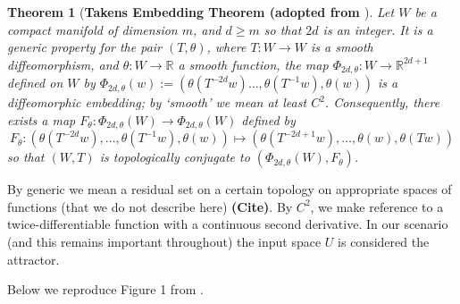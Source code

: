 \documentclass[a4paper,12pt,twoside]{report}
\newtheorem{Theorem}{Theorem}[]
\newcommand{\Ftheta}{\ensuremath{F_\theta}}
\begin{document}
\begin{Theorem} 
	[\bf Takens Embedding Theorem (adopted from \cite{takens1981detecting}] \label{Thm_Takens}
         Let $W$ be a compact manifold of dimension $m$, and $d\ge m$ so that $2d$ is an integer. It is a 
            generic property for the pair $(T, \theta)$,  where $T:W \to W$ is
            a smooth diffeomorphism, and $\theta:W \to \mathbb{R}$ a smooth function, the map $\Phi_{2d,\theta}:W \to \mathbb{R}^{2d+1}$ defined on $W$ by 
            $\Phi_{2d,\theta}(w) := (\theta(T^{-2d}w)\ldots,\theta(T^{-1}w),\theta(w))$
            is a diffeomorphic embedding; by `smooth' we mean at least $C^2$. Consequently, there exists a map $F_\theta: \Phi_{2d,\theta}(W) \to \Phi_{2d,\theta}(W)$ defined by $$F_\theta: (\theta(T^{-2d}w),\ldots,\theta(T^{-1}w),\theta(w)) \mapsto 
            (\theta(T^{-2d+1}w),\ldots,\theta(w),\theta(Tw))$$
           so that $(W,T)$ is topologically conjugate to 
            $(\Phi_{2d,\theta}(W), F_\theta)$.    
\end{Theorem} 

By generic we mean a residual set on a certain topology on appropriate spaces of functions (that we do not describe here) \textbf{(Cite)}.  %
By $C^2$, we make reference to a twice-differentiable function  with a continuous second derivative. In our scenario (and this remains important throughout) the input space $U$ is considered the attractor.~\label{attractor_U}

Below we reproduce Figure 1 from \cite{Supp}.

\end{document}
